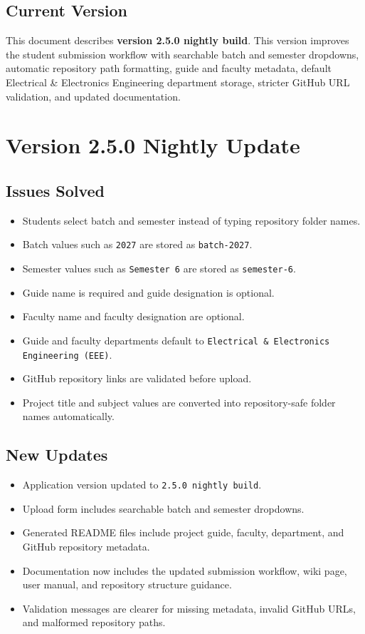 \documentclass[12pt,a4paper]{article}
\begin{document}
\subsection{Current Version}

This document describes \textbf{version 2.5.0 nightly build}. This version improves the student submission workflow with searchable batch and semester dropdowns, automatic repository path formatting, guide and faculty metadata, default Electrical \& Electronics Engineering department storage, stricter GitHub URL validation, and updated documentation.

\section{Version 2.5.0 Nightly Update}

\subsection{Issues Solved}

\begin{itemize}[leftmargin=*]
    \item Students select batch and semester instead of typing repository folder names.
    \item Batch values such as \texttt{2027} are stored as \texttt{batch-2027}.
    \item Semester values such as \texttt{Semester 6} are stored as \texttt{semester-6}.
    \item Guide name is required and guide designation is optional.
    \item Faculty name and faculty designation are optional.
    \item Guide and faculty departments default to \texttt{Electrical \& Electronics Engineering (EEE)}.
    \item GitHub repository links are validated before upload.
    \item Project title and subject values are converted into repository-safe folder names automatically.
\end{itemize}

\subsection{New Updates}

\begin{itemize}[leftmargin=*]
    \item Application version updated to \texttt{2.5.0 nightly build}.
    \item Upload form includes searchable batch and semester dropdowns.
    \item Generated README files include project guide, faculty, department, and GitHub repository metadata.
    \item Documentation now includes the updated submission workflow, wiki page, user manual, and repository structure guidance.
    \item Validation messages are clearer for missing metadata, invalid GitHub URLs, and malformed repository paths.
\end{itemize}
\end{document}
